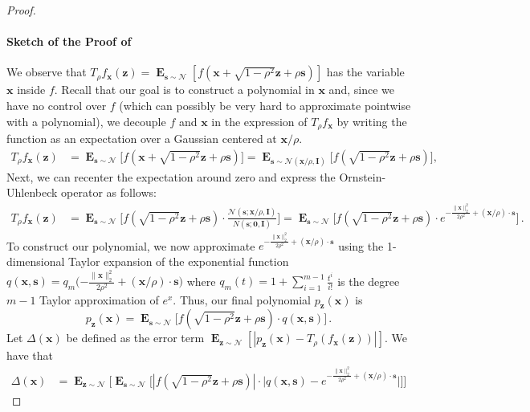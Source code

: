 \documentclass{theoretics}
\newcommand\twonorm[1]{\|#1\|_2}
\renewcommand\vec[1]{\mathbf{#1}}
\DeclareMathOperator*{\E}{\mathbf{E}}
\newcommand{\normal}{\mathcal{N}}
\newcommand{\1}{\Ind}
\newcommand{\x}{\vec x}
\newcommand{\z}{\vec z}
\newcommand{\Gauss}{\mathcal{N}}
\begin{document}
\begin{proof}
\paragraph{Sketch of the Proof of }
   We observe that  $T_{\rho}f_{\x}(\z)=\E_{\vec s\sim \Gauss}[f(\x+\sqrt{1-\rho^2}\z+\rho \vec s)]$ has 
   the variable $\x$ inside $f$. Recall that our goal is to construct a polynomial in $\x$ and, since we have no control over $f$ (which can possibly be very hard to approximate pointwise with a polynomial), we decouple $f$ and $\x$ in the expression of $T_{\rho}f_{\x}$ by writing the function as an expectation over a Gaussian centered at $\x/\rho$. 
    \begin{align*}
        T_{\rho}f_{\x}(\z)&=\E_{\vec s\sim \Gauss}\bigl[f(\x+\sqrt{1-\rho^2}\z+\rho\vec s)\bigr]
        =\E_{\vec s\sim \Gauss(\vec x/\rho,\vec I)}\bigl[f(\sqrt{1-\rho^2}\z+\rho\vec s)\bigr],
        \end{align*}
        Next, we can recenter the expectation around zero and express the Ornstein-Uhlenbeck operator as follows:
    \begin{align*}
        T_{\rho}f_{\x}(\z) &=\E_{\vec s\sim \Gauss}\biggl[f(\sqrt{1-\rho^2}\z+\rho\vec s)\cdot \frac{\Gauss(\vec s;\x/\rho,\vec I)}{N(\vec s;\vec 0,\vec I)}\biggr] =
        \E_{\vec s\sim \Gauss}\biggl[
        f(\sqrt{1-\rho^2}\z+\rho\vec s)\cdot e^{-\frac{\twonorm{\x}^2}{2\rho^2}+(\x/\rho)\cdot \vec s}
        \biggr] \,.
    \end{align*}
    To construct our polynomial, we now approximate ${e^{-\frac{\twonorm{\x}^2}{2\rho^2}+ (\x/\rho)\cdot\vec s}}$ using the 1-dimensional Taylor expansion of the exponential function $q(\x,\vec s)=q_m\bigl({-\frac{\twonorm{\x}^2}{2\rho^2}+(\x/\rho)\cdot\vec s}\bigr)$ where $q_{m}(t)=1+\sum_{i=1}^{m-1}\frac{t^i}{i!}$ is the degree $m-1$ Taylor approximation of $e^x$. Thus, our final polynomial $p_{\z}(\x)$ is 
    \begin{equation}\label{eq:polynomial-p-z}
        p_{\z}(\x)=\E_{\vec s\sim \Gauss}\bigl[f(\sqrt{1-\rho^2}\z+\rho\vec s)\cdot q(\x,\vec s)\bigr]\,.
        \end{equation}
    Let $\Delta(\x)$ be defined as the error term $\E_{\z \sim \normal}[|p_{\z}(\x)-T_{\rho}(f_{\x}(\z))|]$. 
    We have that  
    \begin{align}
    \Delta(\x) &=
    \E_{\z\sim \Gauss}\Big[\E_{\vec s\sim \Gauss}\bigl[|f(\sqrt{1-\rho^2}\z+\rho\vec s)|\cdot 
    \big|q(\x,\vec s)-e^{-\frac{\twonorm{\x}^2}{2\rho^2}+(\x/\rho)\cdot\vec s}\big| \Big]  \Big]

\end{align}
\end{proof}
\end{document}
